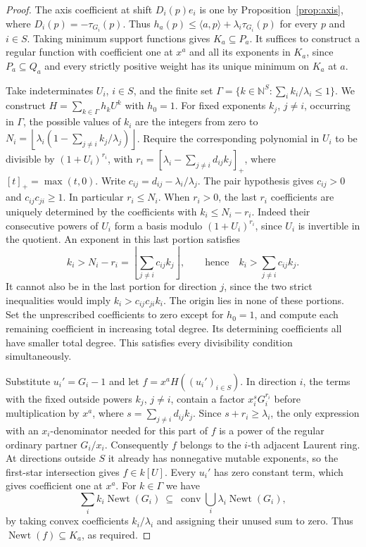 \documentclass[11pt,reqno]{amsart}
\numberwithin{equation}{section}
\theoremstyle{definition}
\theoremstyle{remark}
\DeclareMathOperator{\Newt}{Newt}
\begin{document}
\begin{proof}
The axis coefficient at shift \(D_i(p)e_i\) is one by
Proposition~\ref{prop:axis}, where \(D_i(p)=-\tau_{G_i}(p)\). Thus
\(h_a(p)\le\langle a,p\rangle+\lambda_i\tau_{G_i}(p)\) for every
\(p\) and \(i\in S\). Taking minimum support functions gives
\(K_a\subseteq P_a\). It suffices to construct a regular function
with coefficient one at \(x^a\) and all its exponents in \(K_a\),
since \(P_a\subseteq Q_a\) and every strictly positive weight has
its unique minimum on \(K_a\) at \(a\).

Take indeterminates \(U_i\), \(i\in S\), and the finite set
\(\Gamma=\{k\in\mathbb N^S:\textstyle\sum_i k_i/\lambda_i\le1\}\).
We construct \(H=\sum_{k\in\Gamma} h_k U^k\) with \(h_0=1\).
For fixed exponents \(k_j\), \(j\ne i\), occurring in \(\Gamma\),
the possible values of \(k_i\) are the integers from zero to
\(N_i=\left\lfloor\lambda_i\left(1- \sum_{j\ne i}k_j/\lambda_j\right)\right\rfloor\).
Require the corresponding polynomial in \(U_i\) to be divisible by
\((1+U_i)^{r_i}\), with
\(r_i=[\lambda_i-\sum_{j\ne i}d_{ij}k_j]_+\), where \([t]_+=\max(t,0)\).
Write \(c_{ij}=d_{ij}-\lambda_i/\lambda_j\). The pair hypothesis gives
\(c_{ij}>0\) and \(c_{ij}c_{ji}\ge1\). In particular \(r_i\le N_i\).
When \(r_i>0\), the last \(r_i\) coefficients are uniquely determined
by the coefficients with \(k_i\le N_i-r_i\). Indeed their consecutive
powers of \(U_i\) form a basis modulo \((1+U_i)^{r_i}\), since \(U_i\)
is invertible in the quotient. An exponent in this last portion satisfies
\[ k_i>N_i-r_i=\left\lfloor\sum_{j\ne i} c_{ij}k_j\right\rfloor, \qquad\text{hence}\quad k_i>\sum_{j\ne i}c_{ij}k_j. \]
It cannot also be in the last portion for direction \(j\), since
the two strict inequalities would imply \(k_i>c_{ij}c_{ji}k_i\).
The origin lies in none of these portions. Set the unprescribed
coefficients to zero except for \(h_0=1\), and compute each remaining
coefficient in increasing total degree. Its determining coefficients
all have smaller total degree. This satisfies every divisibility
condition simultaneously.

Substitute \(u_i'=G_i-1\) and let \(f=x^aH((u_i')_{i\in S})\). In direction
\(i\), the terms with the fixed outside powers \(k_j\), \(j\ne i\),
contain a factor \(x_i^sG_i^{r_i}\) before multiplication by \(x^a\),
where \(s=\sum_{j\ne i}d_{ij}k_j\). Since \(s+r_i\ge\lambda_i\),
the only expression with an \(x_i\)-denominator needed for this part
of \(f\) is a power of the regular ordinary partner \(G_i/x_i\).
Consequently \(f\) belongs to the \(i\)-th adjacent Laurent ring.
At directions outside \(S\) it already has nonnegative mutable
exponents, so the first-star intersection gives \(f\in k[U]\).
Every \(u_i'\) has zero constant term, which gives coefficient one
at \(x^a\). For \(k\in\Gamma\) we have
\[ \sum_i k_i\Newt(G_i)\ \subseteq\ \operatorname{conv}\!\bigcup_i\lambda_i\Newt(G_i), \]
by taking convex coefficients \(k_i/\lambda_i\) and assigning their
unused sum to zero. Thus \(\Newt(f)\subseteq K_a\), as required.


\end{proof}
\end{document}

